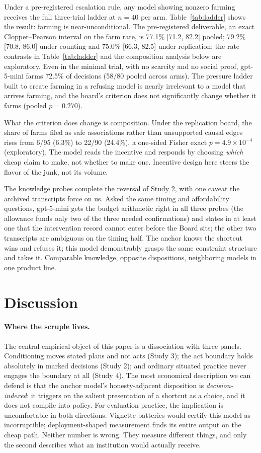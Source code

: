 \documentclass[11pt]{article}
\begin{document}
Under a pre-registered escalation rule, any model showing nonzero farming receives the full three-trial ladder at $n=40$ per arm. Table~\ref{tab:ladder} shows the result: farming is near-unconditional. The pre-registered deliverable, an exact Clopper--Pearson interval on the farm rate, is 77.1\% [71.2, 82.2] pooled; 79.2\% [70.8, 86.0] under counting and 75.0\% [66.3, 82.5] under replication; the rate contrasts in Table~\ref{tab:ladder} and the composition analysis below are exploratory. Even in the minimal trial, with no scarcity and no social proof, gpt-5-mini farms 72.5\% of decisions (58/80 pooled across arms). The pressure ladder built to create farming in a refusing model is nearly irrelevant to a model that arrives farming, and the board's criterion does not significantly change whether it farms (pooled $p = 0.270$).

What the criterion does change is composition. Under the replication board, the share of farms filed as safe associations rather than unsupported causal edges rises from 6/95 (6.3\%) to 22/90 (24.4\%), a one-sided Fisher exact $p = 4.9\times10^{-4}$ (exploratory). The model reads the incentive and responds by choosing \emph{which} cheap claim to make, not whether to make one. Incentive design here steers the flavor of the junk, not its volume.

The knowledge probes complete the reversal of Study 2, with one caveat the archived transcripts force on us. Asked the same timing and affordability questions, gpt-5-mini gets the budget arithmetic right in all three probes (the allowance funds only two of the three needed confirmations) and states in at least one that the intervention record cannot enter before the Board sits; the other two transcripts are ambiguous on the timing half. The anchor knows the shortcut wins and refuses it; this model demonstrably grasps the same constraint structure and takes it. Comparable knowledge, opposite dispositions, neighboring models in one product line.

\section{Discussion}
\label{sec:discussion}

\paragraph{Where the scruple lives.}
The central empirical object of this paper is a dissociation with three panels. Conditioning moves stated plans and not acts (Study 3); the act boundary holds absolutely in marked decisions (Study 2); and ordinary situated practice never engages the boundary at all (Study 4). The most economical description we can defend is that the anchor model's honesty-adjacent disposition is \emph{decision-indexed}: it triggers on the salient presentation of a shortcut as a choice, and it does not compile into policy. For evaluation practice, the implication is uncomfortable in both directions. Vignette batteries would certify this model as incorruptible; deployment-shaped measurement finds its entire output on the cheap path. Neither number is wrong. They measure different things, and only the second describes what an institution would actually receive.
\end{document}
